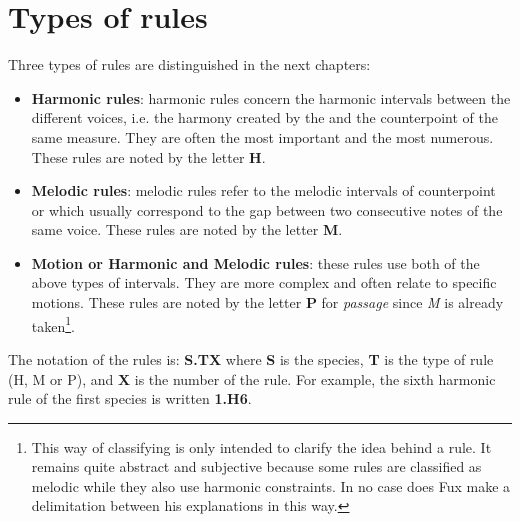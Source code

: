 \section{Types of rules}
Three types of rules are distinguished in the next chapters:
\begin{itemize}
    \item \textbf{Harmonic rules}: harmonic rules concern the harmonic intervals between the different voices, i.e. the harmony created by the \cf and the counterpoint of the same measure. They are often the most important and the most numerous. These rules are noted by the letter \textbf{H}.
    \item \textbf{Melodic rules}: melodic rules refer to the melodic intervals of counterpoint or \cfcomma which usually correspond to the gap between two consecutive notes of the same voice. These rules are noted by the letter \textbf{M}.
    \item \textbf{Motion or Harmonic and Melodic rules}: these rules use both of the above types of intervals. They are more complex and often relate to specific motions. These rules are noted by the letter \textbf{P} for \textit{passage} since \textit{M} is already taken\footnote{This way of classifying is only intended to clarify the idea behind a rule. It remains quite abstract and subjective because some rules are classified as melodic while they also use harmonic constraints. In no case does Fux make a delimitation between his explanations in this way.}.
\end{itemize}
The notation of the rules is: \textbf{S.TX} where \textbf{S} is the species, \textbf{T} is the type of rule (H, M or P), and \textbf{X} is the number of the rule. For example, the sixth harmonic rule of the first species is written \textbf{1.H6}.